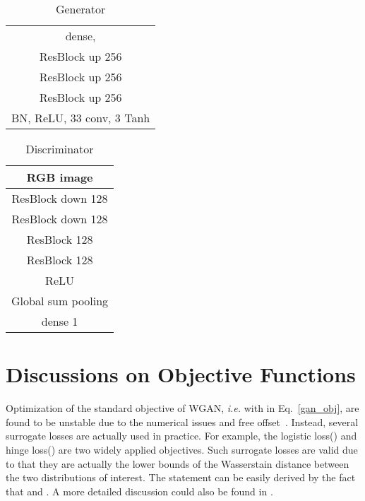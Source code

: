 \documentclass{article}
\begin{document}
\begin{table}[!h]
\centering
\begin{tabular}{c}
    \toprule
    \midrule
     \\
    \midrule
    dense,  \\
    \midrule
    ResBlock up 256\\
    \midrule
    ResBlock up 256\\
    \midrule
    ResBlock up 256\\
    \midrule
    BN, ReLU, 33 conv, 3 Tanh\\
    \midrule
    \bottomrule
\end{tabular}
\vspace{+5pt}
\caption{Generator}
\end{table}

\begin{table}[!h]
\centering
\begin{tabular}{c}
    \toprule
    \midrule
    RGB image  \\
    \midrule
    ResBlock down 128\\
    \midrule
    ResBlock down 128\\
    \midrule
    ResBlock 128\\
    \midrule
    ResBlock 128\\
    \midrule
    ReLU\\
    \midrule
    Global sum pooling\\
    \midrule
    dense  1\\
    \midrule
    \bottomrule
\end{tabular}
\vspace{+5pt}
\caption{Discriminator}
\end{table}



\section{Discussions on Objective Functions}
\label{app:obj}
Optimization of the standard objective of WGAN, \emph{i.e.} with  in Eq.~\ref{gan_obj}, are found to be unstable  due to the numerical issues and free offset~\cite{zhou2019lipschitz,miyato2018spectral}. Instead, several surrogate losses are actually used in practice. For example, the logistic loss() and hinge loss() are two widely applied objectives. Such surrogate losses are valid due to that they are actually the lower bounds of the Wasserstain distance between the two distributions of interest. The statement can be easily derived by the fact that  and . A more detailed discussion could also be found in \cite{tanaka2019discriminator}.
\end{document}
